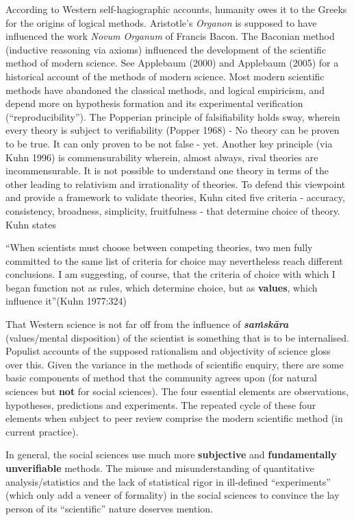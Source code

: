 According to Western self-hagiographic accounts, humanity owes it to the Greeks for the origins of logical methods. Aristotle's {\sl Organon} is supposed to have influenced the work {\sl Novum Organum} of Francis Bacon. The Baconian method (inductive reasoning via axioms) influenced the development of the scientific method of modern science. See Applebaum (2000) and Applebaum (2005) for a historical account of the methods of modern science. Most modern scientific methods have abandoned the classical methods, and logical empiricism, and depend more on hypothesis formation and its experimental verification (``reproducibility''). The Popperian principle of falsifiability holds sway, wherein every theory is subject to verifiability (Popper 1968) - No theory can be proven to be true. It can only proven to be not false - yet.  Another key principle (via Kuhn 1996) is commensurability wherein, almost always, rival theories are incommensurable. It is not possible to understand one theory in terms of the other leading to relativism and irrationality of theories. To defend this viewpoint and provide a framework to validate theories, Kuhn cited five criteria - accuracy, consistency, broadness, simplicity, fruitfulness - that determine choice of theory. Kuhn states 
\begin{myquote}
``When scientists must choose between competing theories, two men fully committed to the same list of criteria for choice may nevertheless reach different conclusions. I am suggesting, of course, that the criteria of choice with which I began function not as rules, which determine choice, but as {\bf values}, which influence it''\hfill (Kuhn 1977:324)
\end{myquote}

That Western science is not far off from the influence of {{\sl\bfseries saṁskāra}\relax} (values/mental disposition) of the scientist is something that is to be internalised. Populist accounts of the supposed rationalism and objectivity of science gloss over this. Given the variance in the methods of scientific enquiry, there are some basic components of method that the community agrees upon (for natural sciences but {\bf not} for social sciences). The four essential elements are observations, hypotheses, predictions and experiments. The repeated cycle of these four elements when subject to peer review comprise the modern scientific method (in current practice).

In general, the social sciences use much more {\bf subjective} and {\bf fundamentally unverifiable} methods. The misuse and misunderstanding of quantitative analysis/statistics and the lack of statistical rigor in ill-defined ``experiments'' (which only add a veneer of formality) in the social sciences to convince the lay person of its ``scientific'' nature deserves mention.

